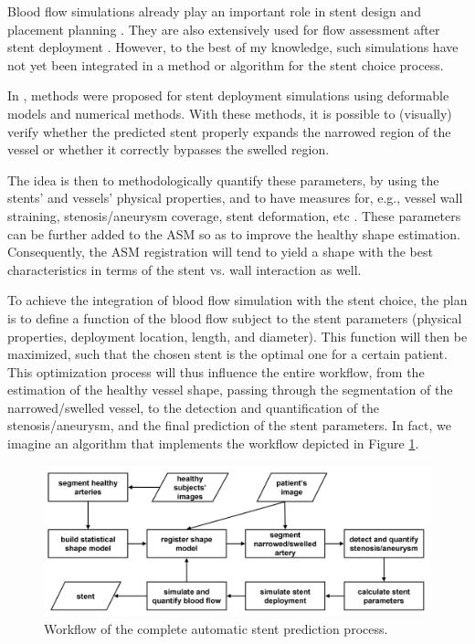 Blood flow simulations already play an important role in stent design and placement planning \citep{deBeule,ATTI-08}. They are also extensively used for flow assessment after stent deployment \citep{Vuk,Gori}. However, to the best of my knowledge, such simulations have not yet been integrated in a method or algorithm for the stent choice process. 

\approach
In \citep{Florez,deBeule}, methods were proposed for stent deployment simulations using deformable models and numerical methods. With these methods, it is possible to (visually) verify whether the predicted stent properly expands the narrowed region of the vessel or whether it correctly bypasses the swelled region. 

The idea is then to methodologically quantify these parameters, by using the stents' and vessels' physical properties, and to have measures for, e.g., vessel wall straining, stenosis/aneurysm coverage, stent deformation, etc \citep{BOUS-09c,BOUS-08c,SULA-08a}. These parameters can be further added to the ASM so as to improve the healthy shape estimation. Consequently, the ASM registration will tend to yield a shape with the best characteristics in terms of the stent vs. wall interaction as well.

To achieve the integration of blood flow simulation with the stent choice, the plan is to define a function of the blood flow subject to the stent parameters (physical properties, deployment location, length, and diameter). This function will then be maximized, such that the chosen stent is the optimal one for a certain patient. This optimization process will thus influence the entire workflow, from the estimation of the healthy vessel shape, passing through the segmentation of the narrowed/swelled vessel, to the detection and quantification of the stenosis/aneurysm, and the final prediction of the stent parameters. In fact, we imagine an algorithm that implements the workflow depicted in Figure \ref{fig:workflow}. 

\begin{figure}%
\centering
\includegraphics[width=0.8\columnwidth]{workflow.png}%
\caption{Workflow of the complete automatic stent prediction process.}%
\label{fig:workflow}%
\end{figure}

